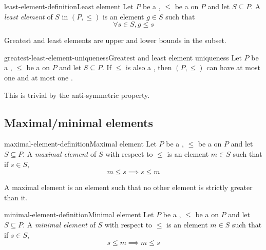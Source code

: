 \documentclass[preview]{standalone}
\begin{document}
\begin{snippetdefinition}{least-element-definition}{Least element}
    Let \(P\) be a \set, \(\leq\) be a \preorder on \(P\) and let \(S\subseteq P\).
    A \textit{least element} of \(S\) in \((P, \leq)\) is an element \(g \in S\) such that
    \[ \forall s\in S, g \leq s \]
\end{snippetdefinition}

\begin{plainhtml}
    Greatest and least elements are upper and lower bounds in the subset.
\end{plainhtml}

\begin{snippetcorollary}{greatest-least-element-uniqueness}{Greatest and least element uniqueness}
    Let \(P\) be a \set, \(\leq\) be a \preorder on \(P\) and let \(S\subseteq P\).
    If \(\leq\) is also a \partialorder, then \((P, \leq)\) can have at most one \greatestelement
    and at most one \leastelement.
\end{snippetcorollary}

\begin{plainhtml}
    This is trivial by the anti-symmetric property.
\end{plainhtml}

\subsection{Maximal/minimal elements}

\begin{snippetdefinition}{maximal-element-definition}{Maximal element}
    Let \(P\) be a \set, \(\leq\) be a \preorder on \(P\) and let \(S\subseteq P\).
    A \emph{maximal element} of \(S\) with respect to \(\leq\) is an element \(m\in S\) such that
    if \(s\in S\),
    \[
        m \leq s \implies s \leq m
    \]
\end{snippetdefinition}

\begin{plainhtml}
    A maximal element is an element such that no other element is strictly greater than it.
\end{plainhtml}

\begin{snippetdefinition}{minimal-element-definition}{Minimal element}
    Let \(P\) be a \set, \(\leq\) be a \preorder on \(P\) and let \(S\subseteq P\).
    A \emph{minimal element} of \(S\) with respect to \(\leq\) is an element \(m\in S\) such that
    if \(s\in S\),
    \[
        s \leq m \implies m \leq s
    \]
\end{snippetdefinition}
\end{document}
